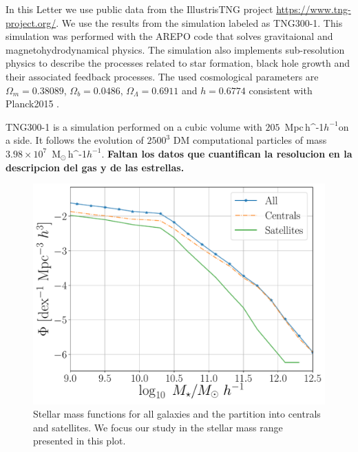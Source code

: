 \documentclass[fleqn,usenatbib]{mnras}
\newcommand{\Msunh}{\,{\rm M}$_{\odot}$\,\ifmmode h^{-1}\else $h^{-1}$\fi}
\newcommand{\Mpch}{\,{\rm Mpc}\,\ifmmode h^{-1}\else $h^{-1}$\fi}
\begin{document}
In this Letter we use public data from the IllustrisTNG project
\url{https://www.tng-project.org/}. 
We use the results from the simulation labeled as TNG300-1.
This simulation was performed with the AREPO code
\citep{2018MNRAS.473.4077P} that solves gravitaional and
magnetohydrodynamical physics.
The simulation also implements sub-resolution physics to describe the
processes related to star formation, black hole growth and their
associated feedback processes.
The used cosmological parameters are $\Omega_m=0.38089$,
$\Omega_b=0.0486$, $\Omega_\Lambda= 0.6911$ and $h=0.6774$ consistent
with Planck2015 \citep{2016A&A...594A..13P}. 

TNG300-1 is a simulation performed on a cubic volume
with  $205$ \Mpch on a side.
It follows the evolution of $2500^3$ DM computational particles of
mass $3.98 \times 10^7$ \Msunh. 
\textbf{Faltan los datos que cuantifican la resolucion en la
  descripcion del gas y de las estrellas.}



\begin{figure}
    \centering
    \includegraphics[width=1\columnwidth]{figuras/Histogramas.pdf}
    \caption{Stellar mass functions for all galaxies and the partition
      into centrals and satellites. We focus our study in the stellar
      mass range presented in this plot.} 
    \label{fig:stellar_fuction}
\end{figure}
\end{document}
